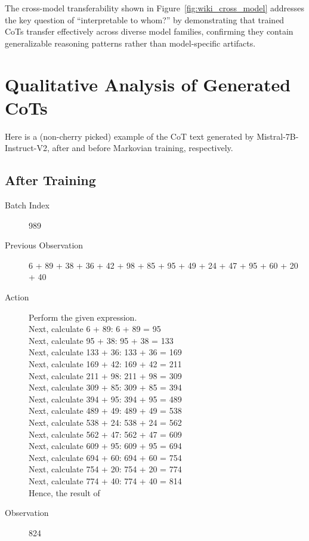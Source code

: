 \documentclass{article}
\begin{document}
The cross-model transferability shown in Figure~\ref{fig:wiki_cross_model} addresses the key question of ``interpretable to whom?'' by demonstrating that trained CoTs transfer effectively across diverse model families, confirming they contain generalizable reasoning patterns rather than model-specific artifacts.

\section{Qualitative Analysis of Generated CoTs}
Here is a (non-cherry picked) example of the CoT text generated by Mistral-7B-Instruct-V2, after and before Markovian training, respectively.  

\subsection{After Training}
\begin{description}
    \item[Batch Index] 989
    \item[Previous Observation] 6 + 89 + 38 + 36 + 42 + 98 + 85 + 95 + 49 + 24 + 47 + 95 + 60 + 20 + 40
    \item[Action] Perform the given expression.\\[1ex]
    Next, calculate 6 + 89: 6 + 89 = 95\\[1ex]
    Next, calculate 95 + 38: 95 + 38 = 133\\[1ex]
    Next, calculate 133 + 36: 133 + 36 = 169\\[1ex]
    Next, calculate 169 + 42: 169 + 42 = 211\\[1ex]
    Next, calculate 211 + 98: 211 + 98 = 309\\[1ex]
    Next, calculate 309 + 85: 309 + 85 = 394\\[1ex]
    Next, calculate 394 + 95: 394 + 95 = 489\\[1ex]
    Next, calculate 489 + 49: 489 + 49 = 538\\[1ex]
    Next, calculate 538 + 24: 538 + 24 = 562\\[1ex]
    Next, calculate 562 + 47: 562 + 47 = 609\\[1ex]
    Next, calculate 609 + 95: 609 + 95 = 694\\[1ex]
    Next, calculate 694 + 60: 694 + 60 = 754\\[1ex]
    Next, calculate 754 + 20: 754 + 20 = 774\\[1ex]
    Next, calculate 774 + 40: 774 + 40 = 814\\[1ex]
    Hence, the result of
    \item[Observation] 824
\end{description}
\end{document}
